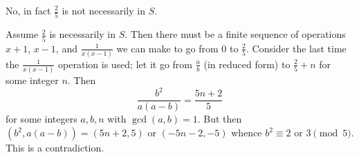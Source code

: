 No, in fact $\frac{2}{5}$ is not necessarily in $S$.

Assume $\frac{2}{5}$ is necessarily in $S$. Then there must be a finite sequence of operations $x+1$, $x-1$, and $\frac{1}{x(x-1)}$ we can make to go from $0$ to $\frac{2}{5}$. Consider the last time the $\frac{1}{x(x-1)}$ operation is used; let it go from $\frac{a}{b}$ (in reduced form) to $\frac{2}{5}+n$ for some integer $n$. Then \[\frac{b^2}{a(a-b)}=\frac{5n+2}{5}\] for some integers $a,b,n$ with $\gcd(a,b)=1$. But then $(b^2,a(a-b))=(5n+2,5)$ or $(-5n-2,-5)$ whence $b^2\equiv2$ or $3\pmod5$. This is a contradiction.